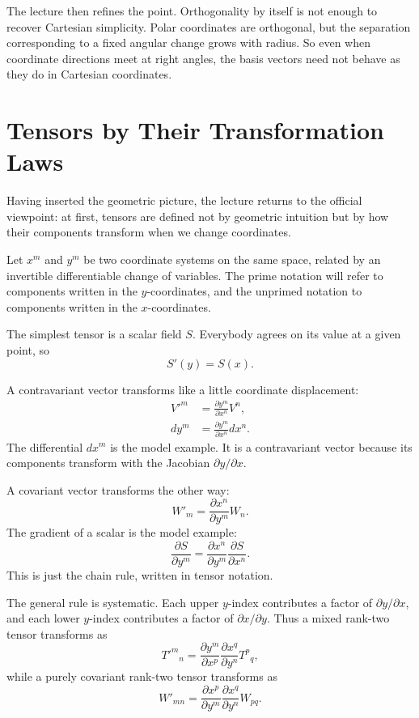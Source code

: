 The lecture then refines the point. Orthogonality by itself is not enough to recover Cartesian simplicity. Polar coordinates are orthogonal, but the separation corresponding to a fixed angular change grows with radius. So even when coordinate directions meet at right angles, the basis vectors need not behave as they do in Cartesian coordinates.

\section{Tensors by Their Transformation Laws}

Having inserted the geometric picture, the lecture returns to the official viewpoint: at first, tensors are defined not by geometric intuition but by how their components transform when we change coordinates.

Let \(x^m\) and \(y^m\) be two coordinate systems on the same space, related by an invertible differentiable change of variables. The prime notation will refer to components written in the \(y\)-coordinates, and the unprimed notation to components written in the \(x\)-coordinates.

The simplest tensor is a scalar field \(S\). Everybody agrees on its value at a given point, so
\begin{equation}
S'(y)=S(x).
\end{equation}

A contravariant vector transforms like a little coordinate displacement:
\begin{align}
V'^m &= \frac{\partial y^m}{\partial x^n}V^n, \\
dy^m &= \frac{\partial y^m}{\partial x^n}dx^n.
\end{align}
The differential \(dx^m\) is the model example. It is a contravariant vector because its components transform with the Jacobian \(\partial y/\partial x\).

A covariant vector transforms the other way:
\begin{equation}
W'_m = \frac{\partial x^n}{\partial y^m}W_n.
\end{equation}
The gradient of a scalar is the model example:
\begin{equation}
\frac{\partial S}{\partial y^m}
=
\frac{\partial x^n}{\partial y^m}\frac{\partial S}{\partial x^n}.
\end{equation}
This is just the chain rule, written in tensor notation.

The general rule is systematic. Each upper \(y\)-index contributes a factor of \(\partial y/\partial x\), and each lower \(y\)-index contributes a factor of \(\partial x/\partial y\). Thus a mixed rank-two tensor transforms as
\begin{equation}
T'^m{}_n
=
\frac{\partial y^m}{\partial x^p}
\frac{\partial x^q}{\partial y^n}
T^p{}_q,
\end{equation}
while a purely covariant rank-two tensor transforms as
\begin{equation}
W'_{mn}
=
\frac{\partial x^p}{\partial y^m}
\frac{\partial x^q}{\partial y^n}
W_{pq}.
\end{equation}

